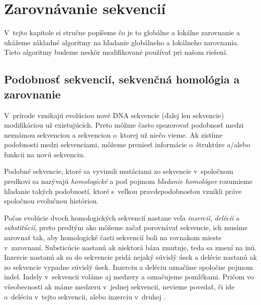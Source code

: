 \chapter{Zarovnávanie sekvencií}
\label{chap:alignment}

V~tejto kapitole si stručne popíšeme čo je to globálne a lokálne zarovnanie a ukážeme základné algoritmy na hľadanie globálneho a lokálneho zarovnania. Tieto algoritmy budeme neskôr modifikované používať pri našom riešení.

\section{Podobnosť sekvencií, sekvenčná homológia a zarovnanie}
V~prírode vznikajú evolúciou nové DNA sekvencie (ďalej len sekvencie) modifikáciou už existujúcich. Preto môžme často spozorovať podobnosť medzi neznámou sekvenciou a sekvenciou o~ktorej už niečo vieme. Ak zistíme podobnosti medzi sekvenciami, môžeme preniesť informácie o~štruktúre a/alebo funkcii na novú sekvenciu.

Podobné sekvencie, ktoré sa vyvinuli mutáciami zo sekvencie v~spoločnom predkovi sa nazývajú \textit{homologické} a pod pojmom \textit{hľadanie homológov} rozumieme hľadanie takých podobností, ktoré s~veľkou pravdepodobnosťou vznikli práve spoločnou evolučnou históriou.



Počas evolúcie dvoch homologických sekvencií nastane veľa \textit{inzercií}, \textit{delécií} a \textit{substitúcií}, preto predtým ako môžeme začať porovnávať sekvencie, ich musíme zarovnať tak, aby homologické časti sekvencií boli na rovnakom mieste v~zarovnaní. Substicúcie nastanú ak niektorá báza zmutuje, teda sa zmení na inú. Inzercie nastanú ak sa do sekvencie pridá nejaký súvislý úsek a delécie nastanú ak zo sekvencie vypadne súvislý úsek. Inzerciu a deléciu označíme spoločne pojmom indel. Indely v~sekvencii voláme aj medzery a označujeme pomlčkami. Pričom vo všeobecnosti ak máme medzeru v~jednej sekvencii, nevieme povedať, či ide o~deléciu v~tejto sekvencii, alebo inzerciu v~druhej \cite{durbin, skripta}.

